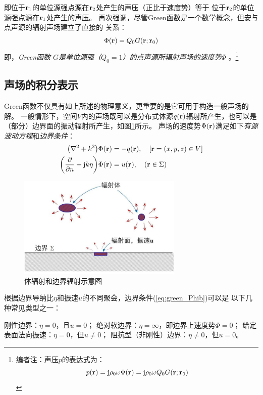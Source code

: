 \documentclass[UTF8]{ctexbook}
\begin{document}
即位于$\vb{r}_1$的单位源强点源在$\vb{r}_2$处产生的声压（正比于速度势）等于
位于$\vb{r}_2$的单位源强点源在$\vb{r}_1$处产生的声压。
再次强调，尽管Green函数是一个数学概念，但安与点声源的辐射声场建立了直接的
关系：
\begin{equation}
	\Phi (\vb{r}) = Q_0 G(\vb{r};\vb{r}_0)
	\label{eq:green_PhiGreen}
\end{equation}
即，\emph{Green函数 $G$是单位源强（$Q_0=1$）的点声源所辐射声场的速度势$\Phi$}
。\footnote{编者注：声压$p$的表达式为：
	$$p(\vb{r}) = \mathrm{j} \rho_0 \omega \Phi(\vb{r}) = \mathrm{j} \rho_0 \omega
	Q_0 G(\vb{r};\vb{r}_0)$$}


\subsection{声场的积分表示}
Green函数不仅具有如上所述的物理意义，更重要的是它可用于构造一般声场的解。
一般情形下，空间$V$内的声场既可以是分布式体源$q(\vb{r})$辐射所产生，也可以是
（部分）边界面的振动辐射所产生，如图\ref{fig:green_sketch}所示。
声场的速度势$\Phi(\vb{r})$满足如下\emph{有源波动方程}和\emph{边界条件}：
\begin{subequations}
	\begin{align}
		\qty(\laplacian+k^2)\Phi(\vb{r}) &=-q(\vb{r})\qc 
		\qty[\vb{r} =(x,y,z)\in V]\label{eq:green_Phia} \\
		\qty(\pdv{n} + \mj k \eta )\Phi(\vb{r}) & = u(\vb{r})\qc
		\qty(\vb{r} \in \Sigma)\label{eq:green_Phib}
	\end{align}\label{eq:green_Phi}
\end{subequations}

\begin{figure}
	\centering
	\includegraphics[width=0.7\textwidth]{img/radiation/green_radiationSketch.jpg}
	\caption{体辐射和边界辐射示意图}
	\label{fig:green_sketch}
\end{figure}

根据边界导纳比$\eta$和振速$u$的不同聚会，边界条件(\ref{eq:green_Phib})可以是
以下几种常见类型之一：
\begin{outline}[enumerate]
	\1 刚性边界：$\eta = 0$，且$u = 0$；
	\1 绝对软边界：$\eta = \infty$，即边界上速度势$\Phi=0$；
	\1 给定表面法向振速：$\eta = 0$，但$u\neq 0$；
	\1 阻抗型（非刚性）边界：$\eta \neq 0$，但$u=0$。
\end{outline}
\end{document}
